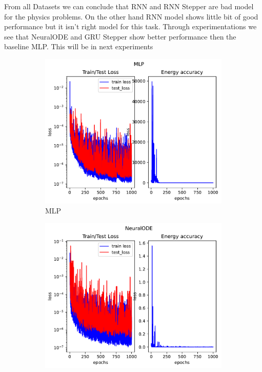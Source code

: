 From all Datasets we can conclude that RNN and RNN Stepper are bad model for the physics problems. On the other hand RNN model shows little bit of good performance but it isn't right model for this task. Through experimentations we see that NeuralODE and GRU Stepper show better performance then the baseline MLP.
This will be in next experiments
\begin{figure}[H]
	\centering
	\begin{subfigure}[b]{0.3\textwidth}
		\centering
		\includegraphics[width=\textwidth]{chapters/chapter5/body3_mlp_loss.pdf}
		\caption{MLP}
	\end{subfigure}
	\hfill
	\begin{subfigure}[b]{0.3\textwidth}
		\centering
		\includegraphics[width=\textwidth]{chapters/chapter5/body3_ode_loss.pdf}

\end{subfigure}
\end{figure}
